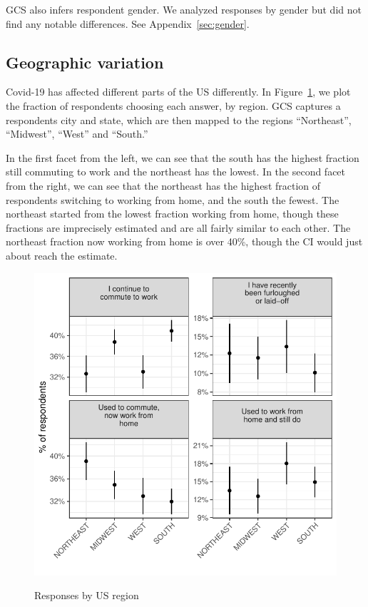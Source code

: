 \documentclass[12pt]{article}
\begin{document}
GCS also infers respondent gender.
We analyzed responses by gender but did not find any notable differences.
See Appendix~\ref{sec:gender}. 

\subsection{Geographic variation} 
Covid-19 has affected different parts of the US differently.
In Figure~\ref{fig:region}, we plot the fraction of respondents choosing each answer, by region.
GCS captures a respondents city and state, which are then mapped to the regions ``Northeast'', ``Midwest'', ``West'' and ``South.'' 

In the first facet from the left, we can see that the south has the highest fraction still commuting to work and the northeast has the lowest. 
In the second facet from the right, we can see that the northeast has the highest fraction of respondents switching to working from home, and the south the fewest.
The northeast started from the lowest fraction working from home, though these fractions are imprecisely estimated and are all fairly similar to each other. 
The northeast fraction now working from home is over 40\%, though the CI would just about reach the \cite{dingel2020} estimate.

\begin{figure}
  \caption{Responses by US region} \label{fig:region}
\centering
\begin{minipage}{1.0 \linewidth}
  \includegraphics[width = \linewidth]{plots/region.pdf} \\
  \begin{footnotesize}
    \end{footnotesize}
\end{minipage}
\end{figure} 
\end{document}

